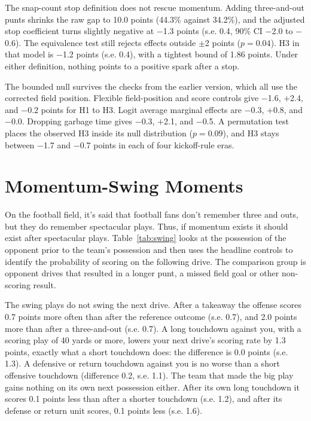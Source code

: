 \documentclass[11pt]{article}
\begin{document}
The snap-count stop definition does not rescue momentum. Adding three-and-out punts shrinks the raw gap to 10.0 points (44.3\% against 34.2\%), and the adjusted stop coefficient turns slightly negative at $-$1.3 points (s.e. 0.4, 90\% CI $-$2.0 to $-$0.6). The equivalence test still rejects effects outside $\pm$2 points ($p=0.04$). H3 in that model is $-$1.2 points (s.e. 0.4), with a tightest bound of 1.86 points. Under either definition, nothing points to a positive spark after a stop.

The bounded null survives the checks from the earlier version, which all use the corrected field position. Flexible field-position and score controls give $-$1.6, $+$2.4, and $-$0.2 points for H1 to H3. Logit average marginal effects are $-$0.3, $+$0.8, and $-$0.0. Dropping garbage time gives $-$0.3, $+$2.1, and $-$0.5. A permutation test places the observed H3 inside its null distribution ($p=0.09$), and H3 stays between $-$1.7 and $-$0.7 points in each of four kickoff-rule eras.

\section{Momentum-Swing Moments}\label{sec:swing}

On the football field, it’s said that football fans don’t remember three and outs, but they do remember spectacular plays. Thus, if momentum exists it should exist after spectacular plays. Table~\ref{tab:swing} looks at the possession of the opponent prior to the team’s possession and then uses the headline controls to identify the probability of scoring on the following drive. The comparison group is opponent drives that resulted in a longer punt, a missed field goal or other non-scoring result.

The swing plays do not swing the next drive. After a takeaway the offense scores 0.7 points more often than after the reference outcome (s.e. 0.7), and 2.0 points more than after a three-and-out (s.e. 0.7). A long touchdown against you, with a scoring play of 40 yards or more, lowers your next drive's scoring rate by 1.3 points, exactly what a short touchdown does: the difference is 0.0 points (s.e. 1.3). A defensive or return touchdown against you is no worse than a short offensive touchdown (difference 0.2, s.e. 1.1). The team that made the big play gains nothing on its own next possession either. After its own long touchdown it scores 0.1 points less than after a shorter touchdown (s.e. 1.2), and after its defense or return unit scores, 0.1 points less (s.e. 1.6).
\end{document}
